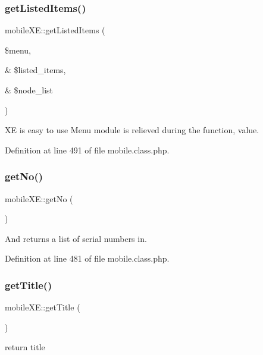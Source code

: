 \subsubsection{\texorpdfstring{get\+Listed\+Items()}{getListedItems()}}
{\footnotesize\ttfamily mobile\+X\+E\+::get\+Listed\+Items (\begin{DoxyParamCaption}\item[{}]{\$menu,  }\item[{\&}]{\$listed\+\_\+items,  }\item[{\&}]{\$node\+\_\+list }\end{DoxyParamCaption})}



XE is easy to use Menu module is relieved during the function, value. 



Definition at line 491 of file mobile.\+class.\+php.

\hypertarget{classmobileXE_aea159c7670d0d25f3c770672f3dd0e66}{}\label{classmobileXE_aea159c7670d0d25f3c770672f3dd0e66} 
\subsubsection{\texorpdfstring{get\+No()}{getNo()}}
{\footnotesize\ttfamily mobile\+X\+E\+::get\+No (\begin{DoxyParamCaption}{ }\end{DoxyParamCaption})}



And returns a list of serial numbers in. 



Definition at line 481 of file mobile.\+class.\+php.

\hypertarget{classmobileXE_ade6f26dcf994e29278983b5496767c14}{}\label{classmobileXE_ade6f26dcf994e29278983b5496767c14} 
\subsubsection{\texorpdfstring{get\+Title()}{getTitle()}}
{\footnotesize\ttfamily mobile\+X\+E\+::get\+Title (\begin{DoxyParamCaption}{ }\end{DoxyParamCaption})}



return title 



